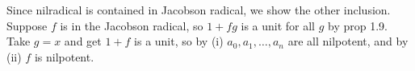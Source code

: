 Since nilradical is contained in Jacobson radical, we show the other inclusion. Suppose $f$ is in the Jacobson radical, so $1+fg$ is a unit for all $g$ by prop 1.9. Take $g=x$ and get $1+f$ is a unit, so by (i) $a_0,a_1,\ldots,a_n$ are all nilpotent, and by (ii) $f$ is nilpotent.
